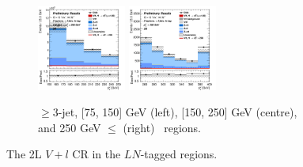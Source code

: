 \begin{figure}[h!]
\begin{subfigure}[b]{\textwidth}
        \includegraphics[width=0.32\textwidth]{Images/VH/Own_fit/prefit_VHcc/Region_distpTV_BMax250_BMin150_DSR_J3_TTypeln_incJet1_T1_L2_Y6051_Prefit.png}
        \includegraphics[width=0.32\textwidth]{Images/VH/Own_fit/prefit_VHcc/Region_distpTV_BMin250_DSR_J3_TTypeln_incJet1_T1_L2_Y6051_Prefit.png}
        \caption{$\geq$3-jet, [75, 150] GeV (left), [150, 250] GeV (centre), and 250  GeV $\leq$ (right) \ptv\ regions.}
        \label{fig:plots_VHcc_2L_LN_3J}
    \end{subfigure}
    \caption{The 2L $V+l$ CR in the $LN$-tagged regions.}
    \label{fig:plots_VHcc_2L_LN}
\end{figure}

